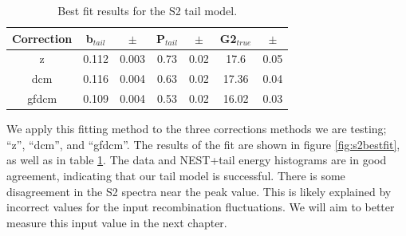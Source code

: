 \begin{table}[h!]
\centering
    \begin{tabular}{ c | c | c | c | c | c | c }
    \hline
    Correction & b$_{tail}$ & $\pm$ & P$_{tail}$ & $\pm$  & G2$_{true}$ & $\pm$ \\
    \hline \hline
    z & 0.112 & 0.003 & 0.73 & 0.02 & 17.6 & 0.05\\
    \hline
    dcm & 0.116 & 0.004 & 0.63 & 0.02 & 17.36 & 0.04 \\
    \hline
    gfdcm & 0.109 & 0.004 & 0.53 & 0.02 & 16.02 & 0.03 \\
    \hline
    \end{tabular}
    \caption{Best fit results for the S2 tail model.}
    \label{tab:s2bestfit}
\end{table}

We apply this fitting method to the three corrections methods we are testing; ``z'', ``dcm'', and ``gfdcm''. The results of the fit are shown in figure \ref{fig:s2bestfit}, as well as in table \ref{tab:s2bestfit}. The data and NEST+tail energy histograms are in good agreement, indicating that our tail model is successful. There is some disagreement in the S2 spectra near the peak value. This is likely explained by incorrect values for the input recombination fluctuations. We will aim to better measure this input value in the next chapter.









